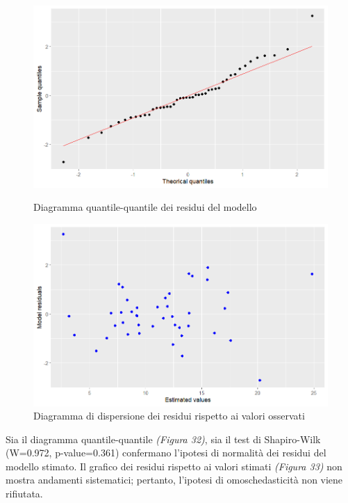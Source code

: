 \documentclass{article} %
\begin{document}
\begin{figure}[H]
    \centering
    \begin{minipage}{0.49\textwidth}
        \centering
        \includegraphics[width=\textwidth]{immagini/qq_glm.png}
        \captionsetup{justification=centering}
        \caption{Diagramma quantile-quantile dei residui del modello}
    \end{minipage}
    \hfill
    \begin{minipage}{0.49\textwidth}
        \centering
        \includegraphics[width=\textwidth]{immagini/res_glm.png}
        \captionsetup{justification=centering}
        \caption{Diagramma di dispersione dei residui rispetto ai valori osservati}
    \end{minipage}
\end{figure}

Sia il diagramma quantile-quantile \textit{(Figura 32)}, sia il test di Shapiro-Wilk (W=0.972, p-value=0.361) confermano l'ipotesi di normalità dei residui del modello stimato. Il grafico dei residui rispetto ai valori stimati \textit{(Figura 33)} non mostra andamenti sistematici; pertanto, l'ipotesi di omoschedasticità non viene rifiutata.
\end{document}
